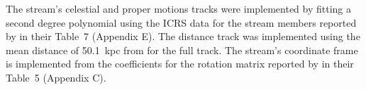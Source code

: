 The stream's celestial and proper motions tracks were implemented by fitting a second degree polynomial using the ICRS data for the stream members reported by \citet{Shipp2019} in their Table~7 (Appendix E). The distance track was implemented using the mean distance of 50.1~kpc from \citet{Shipp2018} for the full track. The stream's coordinate frame is implemented from the coefficients for the rotation matrix reported by \citet{Shipp2019} in their Table~5 (Appendix C).
